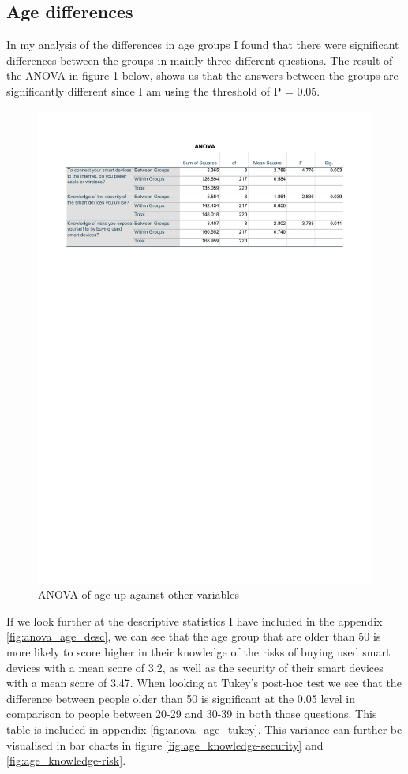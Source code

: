 \subsection{Age differences}
In my analysis of the differences in age groups I found that there were significant differences between the groups in mainly three different questions. The result of the ANOVA in figure \ref{fig:anova_age} below, shows us that the answers between the groups are significantly different since I am using the threshold of P = 0.05. 
\begin{figure}[!h]
    \centering
    \includegraphics[scale=0.7]{figures/tables/anova_age.pdf}
    \caption{ANOVA of age up against other variables}
    \label{fig:anova_age}
\end{figure}
If we look further at the descriptive statistics I have included in the appendix \ref{fig:anova_age_desc}, we can see that the age group that are older than 50 is more likely to score higher in their knowledge of the risks of buying used smart devices with a mean score of 3.2, as well as the security of their smart devices with a mean score of 3.47. When looking at Tukey's post-hoc test we see that the difference between people older than 50 is significant at the 0.05 level in comparison to people between 20-29 and 30-39 in both those questions. This table is included in appendix \ref{fig:anova_age_tukey}. This variance can further be visualised in bar charts in figure \ref{fig:age_knowledge-security} and \ref{fig:age_knowledge-risk}. 

